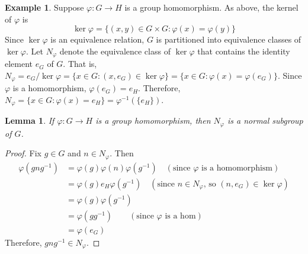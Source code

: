 \documentclass[12pt]{article}
\theoremstyle{plain}
\newtheorem{lemma}[theorem]{Lemma}
\theoremstyle{definition}
\newtheorem{example}[theorem]{Example}
\theoremstyle{remark}
\theoremstyle{remark}
\numberwithin{theorem}{section}
\numberwithin{equation}{section}
\newcommand{\<}{\ensuremath{\langle}}
\renewcommand{\>}{\ensuremath{\rangle}}
\begin{document}
\begin{example}
  Suppose $\varphi: G \rightarrow H$ is a group homomorphism.  As above, the
  kernel of $\varphi$ is
  \[
  \ker \varphi = \{(x, y) \in G \times G :  \varphi(x) = \varphi(y)\}
  \]
  Since $\ker \varphi$ is an equivalence relation, $G$ is partitioned into
  equivalence classes of $\ker \varphi$. 
  Let $N_\varphi$ denote the equivalence class of
  $\ker \varphi$ that contains the identity element $e_G$ of $G$.  That is,
  $N_\varphi = e_G/\ker\varphi = \{x \in G :  (x, e_G) \in \ker \varphi\} =
  \{x \in G :  \varphi(x) = \varphi(e_G)\}$.
  Since $\varphi$ is a homomorphism, $\varphi(e_G) = e_H$.  Therefore,
   $N_\varphi=  \{x \in G :  \varphi(x) = e_H\}=  \varphi^{-1}(\{e_H\})$.

  \begin{lemma}
  If $\varphi: G \rightarrow H$ is a group homomorphism, then 
    $N_\varphi$ is a normal subgroup of $G$.
  \end{lemma}
  \begin{proof}
    Fix $g \in G$ and $n\in N_\varphi$. Then
    \begin{align*}
    \varphi(g n g^{-1}) &= \varphi(g) \varphi(n) \varphi(g^{-1}) 
    \quad (\text{since $\varphi$ is a homomorphism})\\
    &= \varphi(g) e_H \varphi(g^{-1})
    \quad (\text{since $n \in N_\varphi$, so  $(n, e_G) \in \ker\varphi$})\\
    &= \varphi(g) \varphi(g^{-1})\\
    &= \varphi(gg^{-1}) \qquad (\text{since $\varphi$ is a hom})\\
    &= \varphi(e_G)
    \end{align*}
    Therefore, $g n g^{-1}\in N_\varphi$.
  \end{proof}
\end{example}
\end{document}
